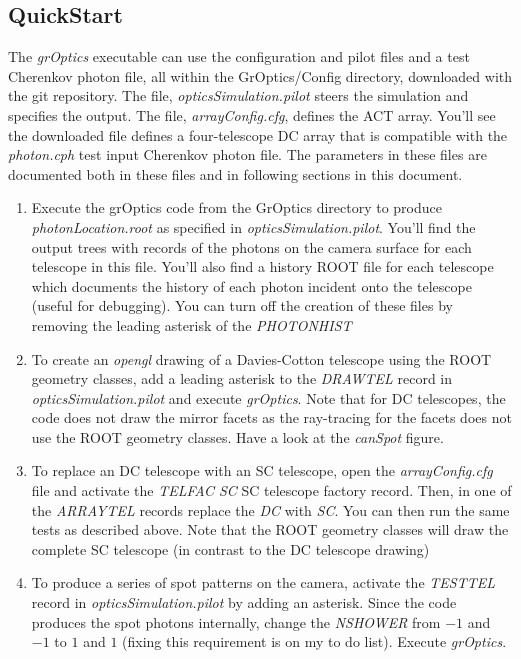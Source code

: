 \documentclass{article}
\begin{document}
\subsection{QuickStart}\label{SS:QSTART}

  The \emph{grOptics} executable can use the
  configuration and pilot files and a test Cherenkov 
  photon file, all within the GrOptics/Config directory, downloaded with 
  the git repository.  The file,
  \emph{opticsSimulation.pilot} steers the simulation and specifies the 
  output. The file, \emph{arrayConfig.cfg}, defines the ACT array. You'll see
  the downloaded file defines a four-telescope DC array that is
  compatible with the \emph{photon.cph} test input Cherenkov photon file.  
  The parameters in these files are documented both in these files and
  in following sections in this document.

\begin{enumerate} 
\item
  Execute the grOptics code from the GrOptics directory to produce 
  \emph{photonLocation.root} as specified in \emph{opticsSimulation.pilot}.
  You'll find the output trees with records of the photons on the camera
  surface for each telescope in this file. You'll also find a history ROOT
  file for each telescope which documents the history of each photon incident
  onto the telescope (useful for debugging). You can turn off the creation 
  of these files by removing the leading asterisk of the \emph{PHOTONHIST}

\item
  To create an \emph{opengl} drawing of a Davies-Cotton telescope 
  using the ROOT geometry classes,
  add a leading asterisk to the 
  \emph{DRAWTEL} record in \emph{opticsSimulation.pilot} and execute
  \emph{grOptics}. Note that for
  DC telescopes, the code does not draw the mirror facets as
  the ray-tracing for the facets does not use the ROOT geometry classes.
  Have a look at the \emph{canSpot} figure.

\item
  To replace an DC telescope with an SC telescope, open the 
  \emph{arrayConfig.cfg} file and activate the 
  \emph{TELFAC SC} SC telescope factory record. Then, in one of the 
  \emph{ARRAYTEL} records replace the \emph{DC} with \emph{SC}. You can then
  run the same tests as described above. Note that the ROOT geometry classes
  will draw the complete SC telescope (in contrast to the DC telescope
  drawing)

\item
  To produce a series of spot patterns on the camera, activate the 
  \emph{TESTTEL} record in \emph{opticsSimulation.pilot} by adding an asterisk.
  Since the code produces the spot photons internally, change the \emph{NSHOWER}
  from $-1$ and $-1$ to $1$ and $1$ (fixing this requirement 
  is on my to do list). Execute \emph{grOptics}.
\end{enumerate}
\end{document}
